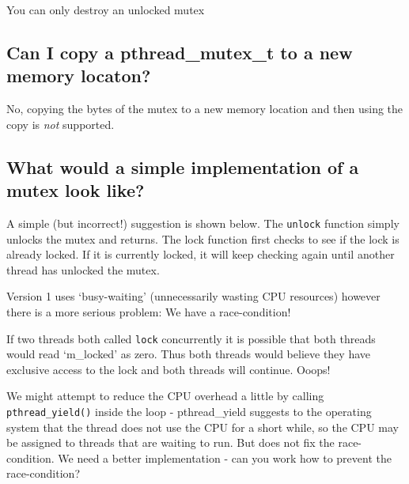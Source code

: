 You can only destroy an unlocked mutex

\subsection{Can I copy a pthread\_mutex\_t to a new memory
locaton?}\label{can-i-copy-a-pthreadux5fmutexux5ft-to-a-new-memory-locaton}

No, copying the bytes of the mutex to a new memory location and then
using the copy is \emph{not} supported.

\subsection{What would a simple implementation of a mutex look
like?}\label{what-would-a-simple-implementation-of-a-mutex-look-like}

A simple (but incorrect!) suggestion is shown below. The \texttt{unlock}
function simply unlocks the mutex and returns. The lock function first
checks to see if the lock is already locked. If it is currently locked,
it will keep checking again until another thread has unlocked the mutex.

\begin{Shaded}
\begin{Highlighting}[]

 
   \NormalTok{\}}

  \NormalTok{;}
\NormalTok{\}}
 
  \NormalTok{;}
\NormalTok{\}}
\end{Highlighting}
\end{Shaded}

Version 1 uses `busy-waiting' (unnecessarily wasting CPU resources)
however there is a more serious problem: We have a race-condition!

If two threads both called \texttt{lock} concurrently it is possible
that both threads would read `m\_locked' as zero. Thus both threads
would believe they have exclusive access to the lock and both threads
will continue. Ooops!

We might attempt to reduce the CPU overhead a little by calling
\texttt{pthread\_yield()} inside the loop - pthread\_yield suggests to
the operating system that the thread does not use the CPU for a short
while, so the CPU may be assigned to threads that are waiting to run.
But does not fix the race-condition. We need a better implementation -
can you work how to prevent the race-condition?

